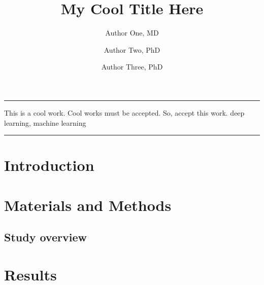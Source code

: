 \documentclass[twocolumn, 8pt]{article}
\title{My Cool Title Here}
\author[1, 2]{Author One, MD}
\author[2]{Author Two, PhD}
\author[1]{Author Three, PhD}
\affil[1]{Institution One, Country;}
\affil[2]{Institution Two, Country}
\date{}
\begin{document}
\par\noindent\rule[-7pt]{15.5cm}{0.2em}
\begin{strip}
    \begin{minipage}{.88\textwidth}
        \maketitle
        \small
        \abstractSection
        {This is a cool work. Cool works must be accepted. So, accept this work.} %
        {} %
        {} %
        {} %
        {} %
        {deep learning, machine learning} %
        
        \par\noindent\rule[-7pt]{15.5cm}{0.2em}
        \hspace{2cm}
    \end{minipage}
\end{strip}


\section*{Introduction}
\lipsum[3-4] \cite{he2016deep}

\section*{Materials and Methods}
\subsection*{Study overview}
\lipsum[3-5]

\section*{Results}
\end{document}
